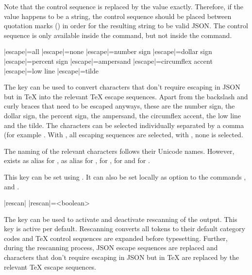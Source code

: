 \documentclass[a4paper]{article}
\begin{document}
{{\begin{codeexamplecolumns}


\end{codeexamplecolumns}

Note that the control sequence \macro{\x} is replaced by the value exactly. Therefore, if the value happens to be a string, the control sequence \macro{\x} should be placed between quotation marks () in order for the resulting string to be valid JSON. The control sequence \macro{\x} is only available inside the \macro{\JSONParse} command, but not inside the \macro{\JSONParseFromFile} command.

\begin{macrodef}
|escape|={all}
|escape|={none}
|escape|={number sign}
|escape|={dollar sign}
|escape|={percent sign}
|escape|={ampersand}
|escape|={circumflex accent}
|escape|={low line}
|escape|={tilde}
\end{macrodef}
The key  can be used to convert characters that don't require escaping in JSON but in TeX into the relevant TeX escape sequences. Apart from the backslash and curly braces that need to be escaped anyways, these are the number sign, the dollar sign, the percent sign, the ampersand, the circumflex accent, the low line and the tilde. The characters can be selected individually separated by a comma (for example . With , all escaping sequences are selected, with , none is selected.

The naming of the relevant characters follows their Unicode names. However,  exists as alias for ,  as alias for ,  for ,  for  and  for .

This key can be set using \macro{\JSONParseSet}. It can also be set locally as option to the commands \macro{\JSONParseValue}, \macro{\JSONParseArrayUse} and \macro{\JSONParseArrayMapFunction}.

\begin{macrodef}
|rescan|
|rescan|={<boolean>}
\end{macrodef}
The key  can be used to activate and deactivate rescanning of the output. This key is active per default. Rescanning converts all tokens to their default category codes and TeX control sequences are expanded before typesetting. Further, during the rescanning process, JSON escape sequences are replaced and characters that don't require escaping in JSON but in TeX are replaced by the relevant TeX escape sequences.

}}
\end{document}
